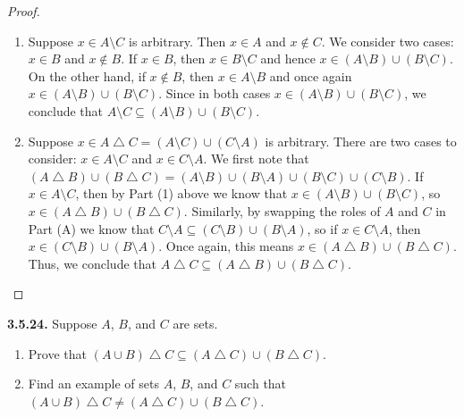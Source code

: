 \documentclass[12pt]{amsart}
\newenvironment{statement}[1]{\smallskip\noindent\color[rgb]{.6627, .3529, .6314} {\bf #1.}}{}
\theoremstyle{definition}
\theoremstyle{remark}
\begin{document}
\begin{proof}
\hfill
\begin{enumerate}
	\item Suppose $x \in A \setminus C$ is arbitrary.
	Then $x \in A$ and $x \notin C$.
	We consider two cases: $x \in B$ and $x \notin B$.
	If $x \in B$, then $x \in B \setminus C$ and hence $x \in (A \setminus B) \cup (B \setminus C)$.
	On the other hand, if $x \notin B$, then $x \in A \setminus B$ and once again
	$x \in (A \setminus B) \cup (B \setminus C)$.
	Since in both cases $x \in (A \setminus B) \cup (B \setminus C)$, we conclude that
	$A \setminus C \subseteq (A \setminus B) \cup (B \setminus C)$.
	
	\item Suppose $x \in A \bigtriangleup C = (A \setminus C) \cup (C \setminus A)$ is arbitrary.
	There are two cases to consider: $x \in A \setminus C$ and $x \in C \setminus A$.
	We first note that $(A \bigtriangleup B) \cup (B \bigtriangleup C) = 
	(A \setminus B) \cup (B \setminus A) \cup (B \setminus C) \cup (C \setminus B)$.
	If $x \in A \setminus C$, then by Part (1) above we know that 
	$x \in (A \setminus B) \cup (B \setminus C)$, so 
	$x \in (A \bigtriangleup B) \cup (B \bigtriangleup C)$.
	Similarly, by swapping the roles of $A$ and $C$ in Part (A) we know that
	$C \setminus A \subseteq (C \setminus B) \cup (B \setminus A)$, so if $x \in C \setminus A$, then
	$x \in (C \setminus B) \cup (B \setminus A)$.
	Once again, this means $x \in (A \bigtriangleup B) \cup (B \bigtriangleup C)$.
	Thus, we conclude that $A \bigtriangleup C \subseteq 
	(A \bigtriangleup B) \cup (B \bigtriangleup C)$.
\end{enumerate}
\end{proof}


\begin{statement}{3.5.24}
Suppose $A$, $B$, and $C$ are sets.
\begin{enumerate}
	\item Prove that $(A \cup B) \bigtriangleup C \subseteq
	(A \bigtriangleup C) \cup (B \bigtriangleup C)$.
	
	\item Find an example of sets $A$, $B$, and $C$ such that $(A \cup B) \bigtriangleup C \neq
	(A \bigtriangleup C) \cup (B \bigtriangleup C)$.
\end{enumerate}
\end{statement}
\end{document}
